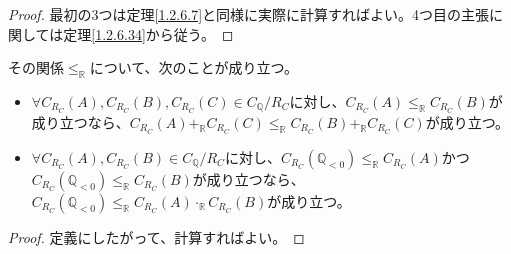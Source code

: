 \documentclass[dvipdfmx]{jsarticle}
\begin{document}
\begin{proof} 最初の3つは定理\ref{1.2.6.7}と同様に実際に計算すればよい。4つ目の主張に関しては定理\ref{1.2.6.34}から従う。
\end{proof}
\begin{thm}\label{1.2.6.36}
その関係$\leq_{\mathbb{R}}$について、次のことが成り立つ。
\begin{itemize}
\item
  $\forall C_{R_{C}}(A),C_{R_{C}}(B),C_{R_{C}}(C) \in C_{\mathbb{Q}} /R_{C} $に対し、$C_{R_{C}}(A) \leq_{\mathbb{R}}C_{R_{C}}(B)$が成り立つなら、$C_{R_{C}}(A) +_{\mathbb{R}}C_{R_{C}}(C) \leq_{\mathbb{R}}C_{R_{C}}(B) +_{\mathbb{R}}C_{R_{C}}(C)$が成り立つ。
\item
  $\forall C_{R_{C}}(A),C_{R_{C}}(B) \in C_{\mathbb{Q}} /R_{C} $に対し、$C_{R_{C}}\left( \mathbb{Q}_{< 0} \right) \leq_{\mathbb{R}}C_{R_{C}}(A)$かつ$C_{R_{C}}\left( \mathbb{Q}_{< 0} \right) \leq_{\mathbb{R}}C_{R_{C}}(B)$が成り立つなら、$C_{R_{C}}\left( \mathbb{Q}_{< 0} \right) \leq_{\mathbb{R}}C_{R_{C}}(A) \cdot_{\mathbb{R}}C_{R_{C}}(B)$が成り立つ。
\end{itemize}
\end{thm}
\begin{proof}
定義にしたがって、計算すればよい。
\end{proof}
\end{document}
